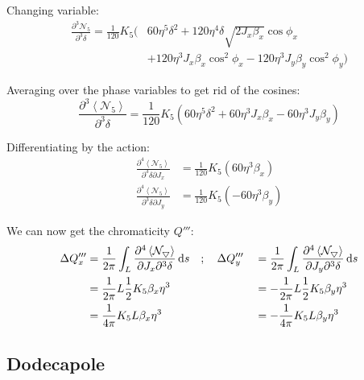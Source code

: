 \documentclass[openright,twoside,headsepline,bibliography=totoc]{scrbook}
\begin{document}
Changing variable: \begin{equation}\begin{aligned}
\frac{\partial^3 \mathcal{N_5}}{\partial^3 \delta} = \frac{1}{120} K_5 \biggl(& 60\eta^5\delta^2 + 120 \eta^4\delta \sqrt{2J_x\beta_x}\cos\phi_x\\
    &+ 120\eta^3 J_x\beta_x\cos^2\phi_x - 120\eta^3 J_y\beta_y\cos^2\phi_y\biggr)
\end{aligned}\end{equation}

Averaging over the phase variables to get rid of the cosines:
\begin{equation}\frac{\partial^3 \left<\mathcal{N_5}\right>}{\partial^3 \delta} = \frac{1}{120} K_5 \left( 60\eta^5\delta^2
  + 60\eta^3 J_x\beta_x- 60\eta^3 J_y\beta_y\right)\end{equation}

Differentiating by the action: \begin{equation}\begin{aligned}
\frac{\partial^4 \left<\mathcal{N}_5\right>}{\partial^3 \delta \partial J_x} &= \frac{1}{120} K_5 \left( 60 \eta^3 \beta_x \right) \\
\frac{\partial^4 \left<\mathcal{N}_5\right>}{\partial^3 \delta \partial J_y} &= \frac{1}{120} K_5 \left(- 60 \eta^3 \beta_y \right)
\end{aligned}\end{equation}

We can now get the chromaticity \(Q'''\):
\begin{equation}\begin{aligned}
\Delta Q'''_x &= \frac{1}{2\pi} \int_L \frac{\partial^4 \left< \mathcal{N_5} \right>}{\partial J_x \partial^3 \delta} \mathop{}\!\mathrm{d} s \quad; \quad \Delta Q'''_y &&= \frac{1}{2\pi} \int_L \frac{\partial^4 \left< \mathcal{N_5} \right>}{\partial J_y \partial^3 \delta} \mathop{}\!\mathrm{d} s \\
&= \frac{1}{2 \pi} L \frac{1}{2} K_5 \beta_x \eta^3  &&= - \frac{1}{2 \pi} L \frac{1}{2} K_5 \beta_y \eta^3 \\
&= \frac{1}{4 \pi}  K_5 L \beta_x \eta^3 &&= - \frac{1}{4 \pi}  K_5 L \beta_y \eta^3
\end{aligned}\end{equation}

\hypertarget{dodecapole-1}{%
\subsection{Dodecapole}\label{dodecapole-1}}
\end{document}
